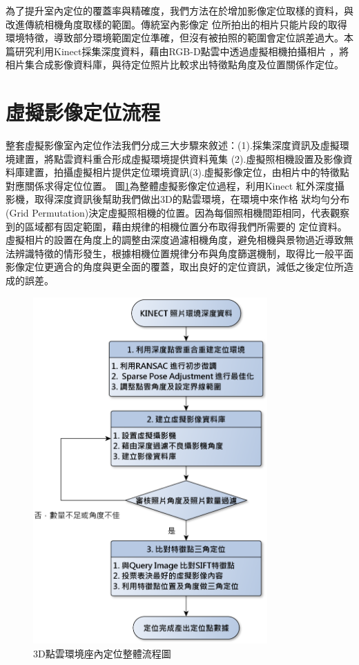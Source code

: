 

	為了提升室內定位的覆蓋率與精確度，我們方法在於增加影像定位取樣的資料，與改進傳統相機角度取樣的範圍。傳統室內影像定
位所拍出的相片只能片段的取得環境特徵，導致部分環境範圍定位準確，但沒有被拍照的範圍會定位誤差過大。本篇研究利用Kinect採集深度資料，藉由RGB-D點雲中透過虛擬相機拍攝相片
，將相片集合成影像資料庫，與待定位照片比較求出特徵點角度及位置關係作定位。

\section{虛擬影像定位流程}

	整套虛擬影像室內定位作法我們分成三大步驟來敘述：(1).採集深度資訊及虛擬環境建置，將點雲資料重合形成虛擬環境提供資料蒐集
(2).虛擬照相機設置及影像資料庫建置，拍攝虛擬相片提供定位環境資訊(3).虛擬影像定位，由相片中的特徵點對應關係求得定位位置。
圖\ref{fig:Entire System Process}為整體虛擬影像定位過程，利用Kinect 紅外深度攝影機，取得深度資訊後幫助我們做出3D的點雲環境，在環境中來作格
狀均勻分布(Grid Permutation)決定虛擬照相機的位置。因為每個照相機間距相同，代表觀察到的區域都有固定範圍，藉由規律的相機位置分布取得我們所需要的
定位資料。虛擬相片的設置在角度上的調整由深度過濾相機角度，避免相機與景物過近導致無法辨識特徵的情形發生，根據相機位置規律分布與角度篩選機制，取得比一般平面
影像定位更適合的角度與更全面的覆蓋，取出良好的定位資訊，減低之後定位所造成的誤差。
  
\begin{figure}
\begin{center}
  \includegraphics[width=0.8\textwidth]{figures/System_Process.eps}
  \caption{3D點雲環境座內定位整體流程圖}
  \label{fig:Entire System Process} 
\end{center}
\end{figure}
  
